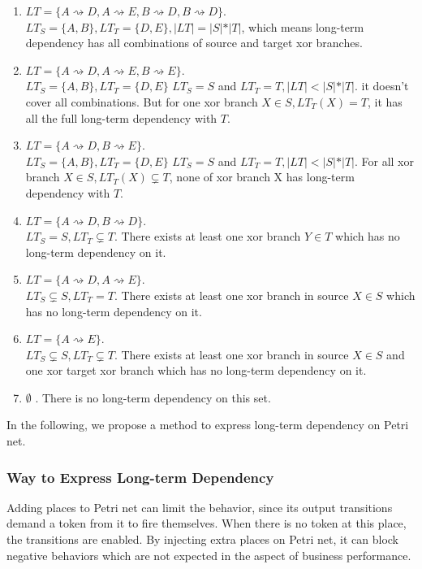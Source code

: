 \begin{enumerate}
	\item $LT=\{ A\rightsquigarrow D, A\rightsquigarrow E, B\rightsquigarrow D, B\rightsquigarrow D\}$. \\
	$LT_S = \{A,B\}, LT_T=\{D,E\}, \vert LT \vert = \vert S \vert * \vert T \vert  $, which means long-term dependency has all combinations of source and target xor branches. 
	\item $LT=\{ A\rightsquigarrow D, A\rightsquigarrow E, B\rightsquigarrow E\}. $\\
	$LT_S = \{A,B\}, LT_T=\{D,E\}$
	$LT_S = S $ and $LT_T = T, \vert LT \vert < \vert S \vert * \vert T \vert $. it doesn't cover all combinations. But for one xor branch $X \in S, LT_T(X)= T$, it has all the full long-term dependency with $T$. 
	\item $LT=\{ A\rightsquigarrow D, B\rightsquigarrow E\}. $\\
	$LT_S = \{A,B\}, LT_T=\{D,E\}$
	$LT_S = S $ and $LT_T = T, \vert LT \vert < \vert S \vert * \vert T \vert $. For all xor branch $X \in S, LT_T(X) \subsetneq T$, none of xor branch X has long-term dependency with $T$.
	\item $LT=\{ A\rightsquigarrow D, B\rightsquigarrow D\}.$ \\
	$LT_S = S ,  LT_T \subsetneq T$. There exists at least one xor branch $Y \in T$ which has no long-term dependency on it.
	\item $LT=\{ A\rightsquigarrow D, A\rightsquigarrow E\}.$ \\
	$LT_S \subsetneq S ,  LT_T = T$.
	There exists at least one xor branch in source $X \in S$ which has no long-term dependency on it.
	\item $LT=\{ A\rightsquigarrow E\}. $\\
	$LT_S \subsetneq S ,  LT_T \subsetneq T$.
	There exists at least one xor branch in source $X \in S$  and one xor target xor branch which has no long-term dependency on it.
	\item $ \emptyset$ . There is no long-term dependency on this set. 
\end{enumerate}
In the following, we propose a method to express long-term dependency on Petri net. 
\subsubsection{Way to Express Long-term Dependency}
Adding places to Petri net can limit the behavior\cite{bergenthum2007process}, since its output transitions demand a token from it to fire themselves. When there is no token at this place, the transitions are enabled. By injecting extra places on Petri net, it can block negative behaviors which are not expected in the aspect of business performance. 

